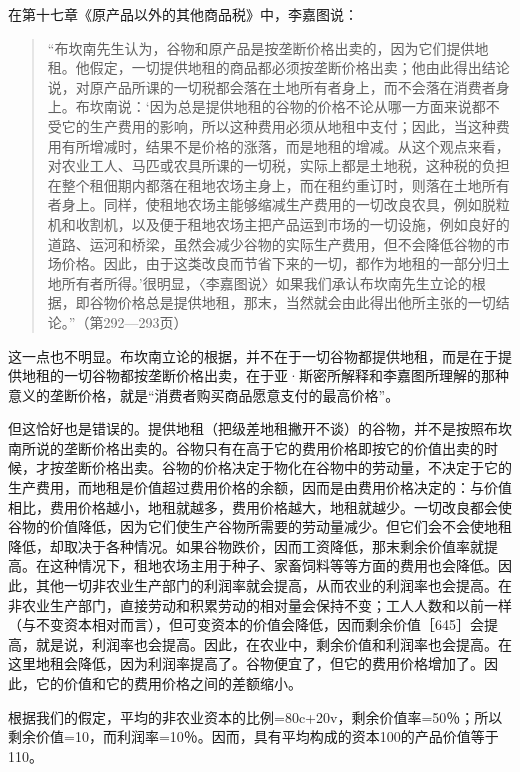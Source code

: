 在第十七章《原产品以外的其他商品税》中，李嘉图说：

\begin{quote}{“布坎南先生认为，谷物和原产品是按垄断价格出卖的，因为它们提供地租。他假定，一切提供地租的商品都必须按垄断价格出卖；他由此得出结论说，对原产品所课的一切税都会落在土地所有者身上，而不会落在消费者身上。布坎南说：‘因为总是提供地租的谷物的价格不论从哪一方面来说都不受它的生产费用的影响，所以这种费用必须从地租中支付；因此，当这种费用有所增减时，结果不是价格的涨落，而是地租的增减。从这个观点来看，对农业工人、马匹或农具所课的一切税，实际上都是土地税，这种税的负担在整个租佃期内都落在租地农场主身上，而在租约重订时，则落在土地所有者身上。同样，使租地农场主能够缩减生产费用的一切改良农具，例如脱粒机和收割机，以及便于租地农场主把产品运到市场的一切设施，例如良好的道路、运河和桥梁，虽然会减少谷物的实际生产费用，但不会降低谷物的市场价格。因此，由于这类改良而节省下来的一切，都作为地租的一部分归土地所有者所得。’很明显，〈李嘉图说〉如果我们承认布坎南先生立论的根据，即谷物价格总是提供地租，那末，当然就会由此得出他所主张的一切结论。”（第292—293页）}\end{quote}

这一点也不明显。布坎南立论的根据，并不在于一切谷物都提供地租，而是在于提供地租的一切谷物都按垄断价格出卖，在于亚·斯密所解释和李嘉图所理解的那种意义的垄断价格，就是“消费者购买商品愿意支付的最高价格”。

但这恰好也是错误的。提供地租（把级差地租撇开不谈）的谷物，并不是按照布坎南所说的垄断价格出卖的。谷物只有在高于它的费用价格即按它的价值出卖的时候，才按垄断价格出卖。谷物的价格决定于物化在谷物中的劳动量，不决定于它的生产费用，而地租是价值超过费用价格的余额，因而是由费用价格决定的：与价值相比，费用价格越小，地租就越多，费用价格越大，地租就越少。一切改良都会使谷物的价值降低，因为它们使生产谷物所需要的劳动量减少。但它们会不会使地租降低，却取决于各种情况。如果谷物跌价，因而工资降低，那末剩余价值率就提高。在这种情况下，租地农场主用于种子、家畜饲料等等方面的费用也会降低。因此，其他一切非农业生产部门的利润率就会提高，从而农业的利润率也会提高。在非农业生产部门，直接劳动和积累劳动的相对量会保持不变；工人人数和以前一样（与不变资本相对而言），但可变资本的价值会降低，因而剩余价值［645］会提高，就是说，利润率也会提高。因此，在农业中，剩余价值和利润率也会提高。在这里地租会降低，因为利润率提高了。谷物便宜了，但它的费用价格增加了。因此，它的价值和它的费用价格之间的差额缩小。

根据我们的假定，平均的非农业资本的比例=80c+20v，剩余价值率=50％；所以剩余价值=10，而利润率=10％。因而，具有平均构成的资本100的产品价值等于110。


